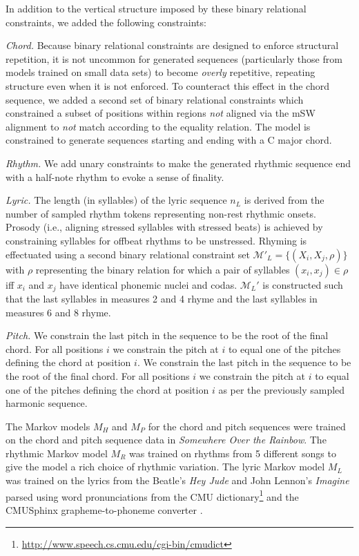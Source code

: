 \documentclass[phd,electronic,oneside,twosidetoc,letterpaper,chaptercenter,parttop,lol,lof,lot]{byumsphd}
\begin{document}
In addition to the vertical structure imposed by these binary relational constraints, we added the following constraints:

\emph{Chord.} Because binary relational constraints are designed to enforce structural repetition, it is not uncommon for generated sequences (particularly those from models trained on small data sets) to become \emph{overly} repetitive, repeating structure even when it is not enforced. To counteract this effect in the chord sequence, we added a second set of binary relational constraints which constrained a subset of positions within regions \emph{not} aligned via the mSW alignment to \emph{not} match according to the equality relation. The model is constrained to generate sequences starting and ending with a C major chord. 

\emph{Rhythm.} We add unary constraints to make the generated rhythmic sequence end with a half-note rhythm to evoke a sense of finality. 

\emph{Lyric.} The length (in syllables) of the lyric sequence $n_L$ is derived from the number of sampled rhythm tokens representing non-rest rhythmic onsets. Prosody (i.e., aligning stressed syllables with stressed beats) is achieved by constraining syllables for offbeat rhythms to be unstressed. Rhyming is effectuated using a second binary relational constraint set $\mathcal{M}'_L=\{(X_i,X_j,\rho)\}$ with $\rho$ representing the binary relation for which a pair of syllables $(x_i,x_j)\in \rho$ iff $x_i$ and $x_j$ have identical phonemic nuclei and codas. $\mathcal{M}_L'$ is constructed such that the last syllables in measures 2 and 4 rhyme and the last syllables in measures 6 and 8 rhyme. 

\emph{Pitch.} We constrain the last pitch in the sequence to be the root of the final chord. For all positions $i$ we constrain the pitch at $i$ to equal one of the pitches defining the chord at position $i$. We constrain the last pitch in the sequence to be the root of the final chord. For all positions $i$ we constrain the pitch at $i$ to equal one of the pitches defining the chord at position $i$ as per the previously sampled harmonic sequence.

The Markov models $M_H$ and $M_P$ for the chord and pitch sequences were trained on the chord and pitch sequence data in \textit{Somewhere Over the Rainbow}. The rhythmic Markov model $M_R$ was trained on rhythms from 5 different songs to give the model a rich choice of rhythmic variation. The lyric Markov model $M_L$ was trained on the lyrics from the Beatle's \textit{Hey Jude} and John Lennon's \emph{Imagine} parsed using word pronunciations from the CMU dictionary\footnote{\url{http://www.speech.cs.cmu.edu/cgi-bin/cmudict}} and the CMUSphinx grapheme-to-phoneme converter \cite{Walker2004}.
\end{document}
